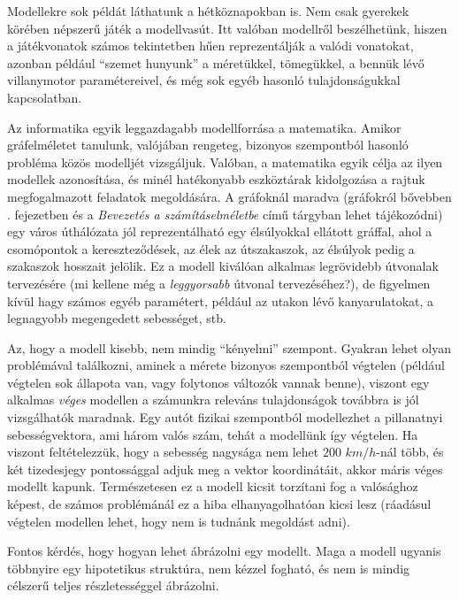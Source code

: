 \begin{pelda}
	Modellekre sok példát láthatunk a hétköznapokban is. Nem csak gyerekek körében népszerű játék a modellvasút. Itt valóban modellről beszélhetünk, hiszen a játékvonatok számos tekintetben hűen reprezentálják a valódi vonatokat, azonban például ``szemet hunyunk'' a méretükkel, tömegükkel, a bennük lévő villanymotor paramétereivel, és még sok egyéb hasonló tulajdonságukkal kapcsolatban.
	
	Az informatika egyik leggazdagabb modellforrása a matematika. Amikor gráfelméletet tanulunk, valójában rengeteg, bizonyos szempontból hasonló probléma közös modelljét vizsgáljuk. Valóban, a matematika egyik célja az ilyen modellek azonosítása, és minél hatékonyabb eszköztárak kidolgozása a rajtuk megfogalmazott feladatok megoldására. A gráfoknál maradva (gráfokról bővebben . fejezetben és a \emph{Bevezetés a számításelméletbe} című tárgyban lehet tájékozódni) egy város úthálózata jól reprezentálható egy élsúlyokkal ellátott gráffal, ahol a csomópontok a kereszteződések, az élek az útszakaszok, az élsúlyok pedig a szakaszok hosszait jelölik. Ez a modell kiválóan alkalmas legrövidebb útvonalak tervezésére (mi kellene még a \emph{leggyorsabb} útvonal tervezéséhez?), de figyelmen kívül hagy számos egyéb paramétert, például az utakon lévő kanyarulatokat, a legnagyobb megengedett sebességet, stb.
\end{pelda}

\begin{megjegyzes}
	Az, hogy a modell kisebb, nem mindig ``kényelmi'' szempont. Gyakran lehet olyan problémával találkozni, aminek a mérete bizonyos szempontból végtelen (például végtelen sok állapota van, vagy folytonos változók vannak benne), viszont egy alkalmas \emph{véges} modellen a számunkra releváns tulajdonságok továbbra is jól vizsgálhatók maradnak. Egy autót fizikai szempontból modellezhet a pillanatnyi sebességvektora, ami három valós szám, tehát a modellünk így végtelen. Ha viszont feltételezzük, hogy a sebesség nagysága nem lehet $200$ $km/h$-nál több, és két tizedesjegy pontossággal adjuk meg a vektor koordinátáit, akkor máris véges modellt kapunk. Természetesen ez a modell kicsit torzítani fog a valósághoz képest, de számos problémánál ez a hiba elhanyagolhatóan kicsi lesz (ráadásul végtelen modellen lehet, hogy nem is tudnánk megoldást adni).
\end{megjegyzes}

Fontos kérdés, hogy hogyan lehet ábrázolni egy modellt. Maga a modell ugyanis többnyire egy hipotetikus struktúra, nem kézzel fogható, és nem is mindig célszerű teljes részletességgel ábrázolni.

